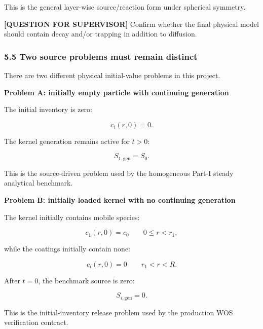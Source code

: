 \documentclass[11pt,a4paper]{article}
\begin{document}
This is the general layer-wise source/reaction form under spherical symmetry.

\textbf{[QUESTION FOR SUPERVISOR]} Confirm whether the final physical model should contain decay and/or trapping in addition to diffusion.

\subsubsection*{5.5 Two source problems must remain distinct}

There are two different physical initial-value problems in this project.

\textbf{Problem A: initially empty particle with continuing generation}

The initial inventory is zero:

\begin{equation}
c_i(r,0)=0.
\tag{TRISO-IC-100}
\label{eq:triso-ic-100}
\end{equation}

The kernel generation remains active for $t>0$:

\begin{equation}
S_{1,\mathrm{gen}}=S_0.
\tag{TRISO-IC-101}
\label{eq:triso-ic-101}
\end{equation}

This is the source-driven problem used by the homogeneous Part-I steady analytical benchmark.

\textbf{Problem B: initially loaded kernel with no continuing generation}

The kernel initially contains mobile species:

\begin{equation}
c_1(r,0)=c_0
\qquad
0\le r<r_1,
\tag{TRISO-IC-102}
\label{eq:triso-ic-102}
\end{equation}

while the coatings initially contain none:

\begin{equation}
c_i(r,0)=0
\qquad
r_1<r<R.
\tag{TRISO-IC-103}
\label{eq:triso-ic-103}
\end{equation}

After $t=0$, the benchmark source is zero:

\begin{equation}
S_{i,\mathrm{gen}}=0.
\tag{TRISO-IC-104}
\label{eq:triso-ic-104}
\end{equation}

This is the initial-inventory release problem used by the production WOS verification contract.
\end{document}

